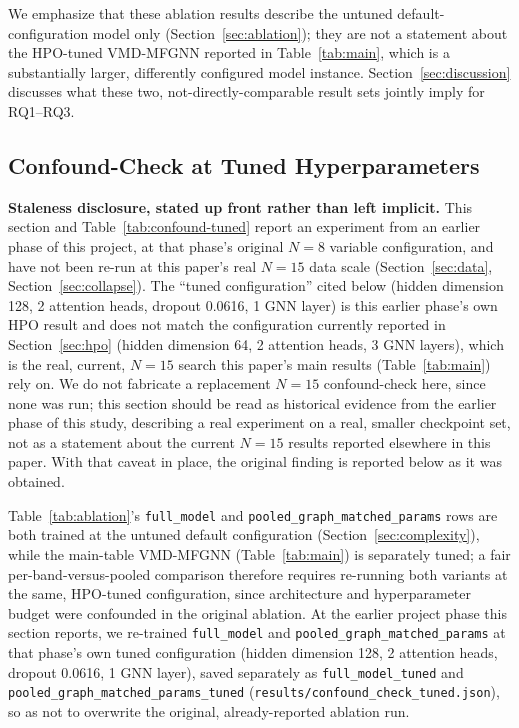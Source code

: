 \documentclass[journal]{IEEEtran}
\begin{document}
We emphasize that these ablation results describe the untuned default-configuration model only (Section~\ref{sec:ablation}); they are not a statement about the HPO-tuned VMD-MFGNN reported in Table~\ref{tab:main}, which is a substantially larger, differently configured model instance. Section~\ref{sec:discussion} discusses what these two, not-directly-comparable result sets jointly imply for RQ1--RQ3.

\subsection{Confound-Check at Tuned Hyperparameters}
\label{sec:confound-tuned}

\textbf{Staleness disclosure, stated up front rather than left implicit.} This section and Table~\ref{tab:confound-tuned} report an experiment from an earlier phase of this project, at that phase's original $N=8$ variable configuration, and have not been re-run at this paper's real $N=15$ data scale (Section~\ref{sec:data}, Section~\ref{sec:collapse}). The ``tuned configuration'' cited below (hidden dimension 128, 2 attention heads, dropout 0.0616, 1 GNN layer) is this earlier phase's own HPO result and does not match the configuration currently reported in Section~\ref{sec:hpo} (hidden dimension 64, 2 attention heads, 3 GNN layers), which is the real, current, $N=15$ search this paper's main results (Table~\ref{tab:main}) rely on. We do not fabricate a replacement $N=15$ confound-check here, since none was run; this section should be read as historical evidence from the earlier phase of this study, describing a real experiment on a real, smaller checkpoint set, not as a statement about the current $N=15$ results reported elsewhere in this paper. With that caveat in place, the original finding is reported below as it was obtained.

Table~\ref{tab:ablation}'s \texttt{full\_model} and \texttt{pooled\_graph\_matched\_params} rows are both trained at the untuned default configuration (Section~\ref{sec:complexity}), while the main-table VMD-MFGNN (Table~\ref{tab:main}) is separately tuned; a fair per-band-versus-pooled comparison therefore requires re-running both variants at the same, HPO-tuned configuration, since architecture and hyperparameter budget were confounded in the original ablation. At the earlier project phase this section reports, we re-trained \texttt{full\_model} and \texttt{pooled\_graph\_matched\_params} at that phase's own tuned configuration (hidden dimension 128, 2 attention heads, dropout 0.0616, 1 GNN layer), saved separately as \texttt{full\_model\_tuned} and \texttt{pooled\_graph\_matched\_params\_tuned} (\texttt{results/confound\_check\_tuned.json}), so as not to overwrite the original, already-reported ablation run.
\end{document}
